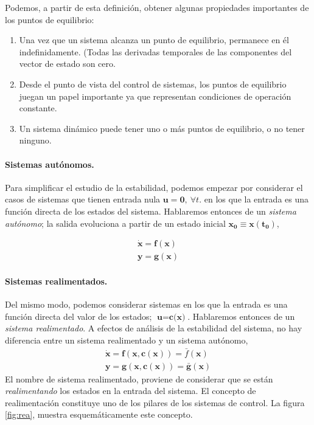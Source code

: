 Podemos, a partir de esta definición, obtener algunas propiedades importantes de los puntos de equilibrio:
\begin{enumerate}
\item Una vez que un sistema alcanza un punto de equilibrio, permanece en él indefinidamente. (Todas las derivadas temporales de las componentes del vector de estado son cero.
\item Desde el punto de vista del control de sistemas, los puntos de equilibrio juegan un papel importante ya que representan condiciones de operación constante.
\item Un sistema dinámico puede tener uno o más puntos de equilibrio, o no tener ninguno. 
\end{enumerate}

\paragraph{Sistemas autónomos.} Para simplificar el estudio de la estabilidad, podemos empezar por considerar el casos de sistemas que tienen entrada nula $\mathbf{u} = \mathbf{0}, \ \forall t$. en los que la entrada es una función directa de los estados del sistema. Hablaremos entonces de un \emph{sistema autónomo}; la salida evoluciona a partir de un estado inicial $\mathbf{x_0}\equiv \mathbf{x(t_0)}$,

\begin{align}
\mathbf{\dot{x}} = \mathbf{f}(\mathbf{x})\\
\mathbf{y} = \mathbf{g}(\mathbf{x})
\end{align}

\paragraph{Sistemas realimentados.} Del mismo modo, podemos considerar sistemas en los que la entrada es una función directa del valor de los estados; $\textbf{u}= \textbf{c(x)}$. Hablaremos entonces de un \emph{sistema realimentado}. A efectos de análisis de la estabilidad del sistema, no hay diferencia entre un sistema realimentado y un sistema autónomo,
\begin{align}
\mathbf{\dot{x}} = \mathbf{f}(\mathbf{x},\mathbf{c(x)}) = \bar{f}(\mathbf{x})\\
\mathbf{y} = \mathbf{g}(\mathbf{x},\mathbf{c(x)}) = \bar{\mathbf{g}}(\mathbf{x})
\end{align}
El nombre de sistema realimentado, proviene de considerar que se están \emph{realimentando} los estados en la entrada del sistema. El concepto de realimentación constituye uno de los pilares de los sistemas de control. La figura \ref{fig:rea}, muestra esquemáticamente este concepto.

